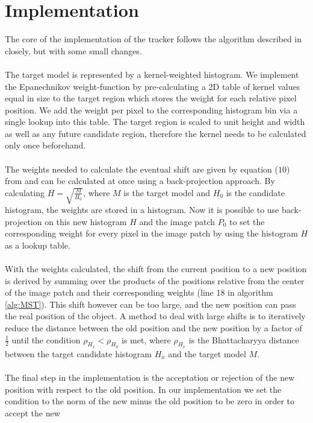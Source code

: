 \documentclass[a4paper,11pt]{article}
\begin{document}
	\section{Implementation}
		The core of the implementation of the tracker follows the algorithm described
		in \cite{KBOT} closely, but with some small changes.
		\\ \\
		The target model is represented by a kernel-weighted histogram. We implement the
		Epanechnikov weight-function by pre-calculating a 2D table of kernel values equal
		in size to the target region which stores the weight for each relative pixel
		position. We add the weight per pixel to the corresponding histogram bin via a single
		lookup into this table. The target region is scaled to unit height and width as well
		as any future candidate region, therefore the kernel needs to be calculated only once
		beforehand.
		\\ \\
		The weights needed to calculate the eventual shift are given by equation ($10$)
		from \cite{KBOT} and can be calculated at once using a back-projection approach.
		By calculating $H=\sqrt{\frac{M}{H_0}}$, where $M$ is the target model and $H_0$
		is the candidate histogram, the weights are stored in a histogram. Now it is
		possible to use back-projection on this new histogram $H$ and the image patch
		$P_0$ to set the corresponding weight for every pixel in the image patch by
		using the histogram $H$ as a lookup table.
		\\ \\
		With the weights calculated, the shift from the current position to a new position
		is derived by summing over the products of the positions relative from the center
		of the image patch and their corresponding weights (line 18 in algorithm \ref{alg:MST}).
		This shift however can be too large, and the new position can pass the real position
		of the object. A method to deal with large shifts is to iteratively reduce the distance
		between the old position and the new position by a factor of $\frac{1}{2}$ until the
		condition $\rho_{H_1} < \rho_{H_0}$ is met, where $\rho_{H_x}$ is the Bhattacharyya
		distance between the target candidate histogram $H_x$ and the target model $M$.
		\\ \\
		The final step in the implementation is the acceptation or rejection of the new
		position with respect to the old position. In our implementation we set the condition
		to the norm of the new minus the old position to be zero in order to accept the new
\end{document}
